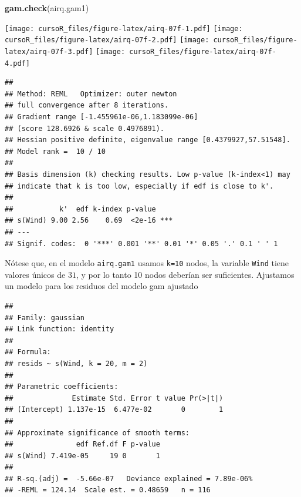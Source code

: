 \documentclass[]{book}
\newenvironment{Shaded}{\begin{snugshade}}{\end{snugshade}}
\newcommand{\KeywordTok}[1]{\textcolor[rgb]{0.13,0.29,0.53}{\textbf{#1}}}
\newcommand{\DataTypeTok}[1]{\textcolor[rgb]{0.13,0.29,0.53}{#1}}
\newcommand{\DecValTok}[1]{\textcolor[rgb]{0.00,0.00,0.81}{#1}}
\newcommand{\StringTok}[1]{\textcolor[rgb]{0.31,0.60,0.02}{#1}}
\newcommand{\OtherTok}[1]{\textcolor[rgb]{0.56,0.35,0.01}{#1}}
\newcommand{\OperatorTok}[1]{\textcolor[rgb]{0.81,0.36,0.00}{\textbf{#1}}}
\newcommand{\NormalTok}[1]{#1}
\begin{document}
\begin{Shaded}
\begin{Highlighting}[]
\KeywordTok{gam.check}\NormalTok{(airq.gam1)}
\end{Highlighting}
\end{Shaded}

\texttt{[image: cursoR\_files/figure-latex/airq-07f-1.pdf]}
\texttt{[image: cursoR\_files/figure-latex/airq-07f-2.pdf]}
\texttt{[image: cursoR\_files/figure-latex/airq-07f-3.pdf]}
\texttt{[image: cursoR\_files/figure-latex/airq-07f-4.pdf]}

\begin{verbatim}
## 
## Method: REML   Optimizer: outer newton
## full convergence after 8 iterations.
## Gradient range [-1.455961e-06,1.183099e-06]
## (score 128.6926 & scale 0.4976891).
## Hessian positive definite, eigenvalue range [0.4379927,57.51548].
## Model rank =  10 / 10 
## 
## Basis dimension (k) checking results. Low p-value (k-index<1) may
## indicate that k is too low, especially if edf is close to k'.
## 
##           k'  edf k-index p-value    
## s(Wind) 9.00 2.56    0.69  <2e-16 ***
## ---
## Signif. codes:  0 '***' 0.001 '**' 0.01 '*' 0.05 '.' 0.1 ' ' 1
\end{verbatim}

Nótese que, en el modelo \texttt{airq.gam1} usamos \texttt{k=10} nodos,
la variable \texttt{Wind} tiene valores únicos de \(31\), y por lo tanto
10 nodos deberían ser suficientes. Ajustamos un modelo para los residuos
del modelo gam ajustado

\begin{Shaded}
\end{Shaded}

\begin{verbatim}
## 
## Family: gaussian 
## Link function: identity 
## 
## Formula:
## resids ~ s(Wind, k = 20, m = 2)
## 
## Parametric coefficients:
##              Estimate Std. Error t value Pr(>|t|)
## (Intercept) 1.137e-15  6.477e-02       0        1
## 
## Approximate significance of smooth terms:
##               edf Ref.df F p-value
## s(Wind) 7.419e-05     19 0       1
## 
## R-sq.(adj) =  -5.66e-07   Deviance explained = 7.89e-06%
## -REML = 124.14  Scale est. = 0.48659   n = 116
\end{verbatim}
\end{document}
